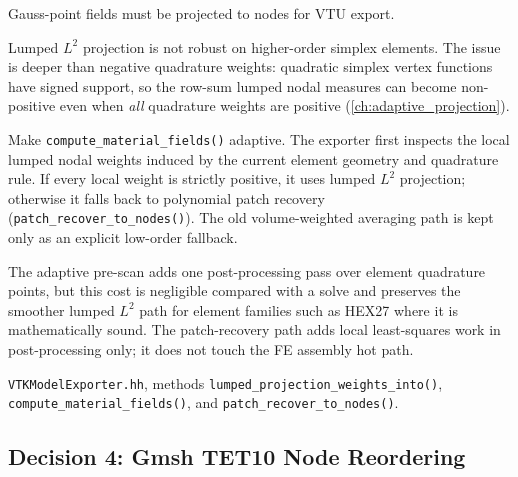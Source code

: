 \begin{description}[leftmargin=0pt,style=nextline]
  \item[Context] Gauss-point fields must be projected to nodes for VTU export.

  \item[Problem] Lumped $L^2$ projection is not robust on higher-order simplex
    elements.  The issue is deeper than negative quadrature weights:
    quadratic simplex vertex functions have signed support, so the row-sum
    lumped nodal measures can become non-positive even when \emph{all}
    quadrature weights are positive (\cref{ch:adaptive_projection}).

  \item[Decision] Make \texttt{compute\_material\_fields()} adaptive.  The
    exporter first inspects the local lumped nodal weights induced by the
    current element geometry and quadrature rule.  If every local weight is
    strictly positive, it uses lumped $L^2$ projection; otherwise it falls
    back to polynomial patch recovery
    (\texttt{patch\_recover\_to\_nodes()}).  The old volume-weighted averaging
    path is kept only as an explicit low-order fallback.

  \item[Trade-off] The adaptive pre-scan adds one post-processing pass over
    element quadrature points, but this cost is negligible compared with a
    solve and preserves the smoother lumped $L^2$ path for element families
    such as HEX27 where it is mathematically sound.  The patch-recovery path
    adds local least-squares work in post-processing only; it does not touch
    the FE assembly hot path.

  \item[Source] \texttt{VTKModelExporter.hh}, methods
    \texttt{lumped\_projection\_weights\_into()},
    \texttt{compute\_material\_fields()}, and
    \texttt{patch\_recover\_to\_nodes()}.
\end{description}


\subsection{Decision 4: Gmsh TET10 Node Reordering}
\label{sec:dec_reorder}

